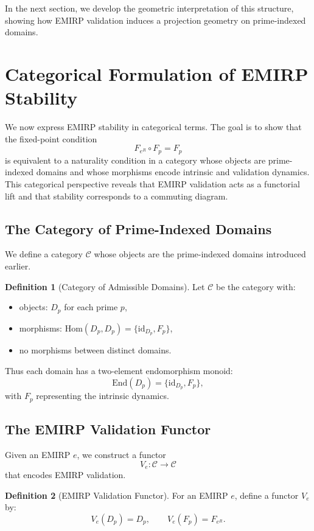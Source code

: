\documentclass[11pt]{article}
\theoremstyle{definition}
\newtheorem{definition}{Definition}[section]
\theoremstyle{plain}
\theoremstyle{remark}
\begin{document}
In the next section, we develop the geometric interpretation of this
structure, showing how EMIRP validation induces a projection geometry on
prime-indexed domains.

\section{Categorical Formulation of EMIRP Stability}

We now express EMIRP stability in categorical terms. The goal is to show
that the fixed-point condition
\[
F_{e^R} \circ F_p = F_p
\]
is equivalent to a naturality condition in a category whose objects are
prime-indexed domains and whose morphisms encode intrinsic and
validation dynamics. This categorical perspective reveals that EMIRP
validation acts as a functorial lift and that stability corresponds to a
commuting diagram.

\subsection{The Category of Prime-Indexed Domains}

We define a category $\mathcal{C}$ whose objects are the prime-indexed
domains introduced earlier.

\begin{definition}[Category of Admissible Domains]
Let $\mathcal{C}$ be the category with:
\begin{itemize}
    \item objects: $D_p$ for each prime $p$,
    \item morphisms: $\mathrm{Hom}(D_p, D_p) = \{ \mathrm{id}_{D_p}, F_p \}$,
    \item no morphisms between distinct domains.
\end{itemize}
\end{definition}

Thus each domain has a two-element endomorphism monoid:
\[
\mathrm{End}(D_p) = \{ \mathrm{id}_{D_p}, F_p \},
\]
with $F_p$ representing the intrinsic dynamics.

\subsection{The EMIRP Validation Functor}

Given an EMIRP $e$, we construct a functor
\[
V_e : \mathcal{C} \to \mathcal{C}
\]
that encodes EMIRP validation.

\begin{definition}[EMIRP Validation Functor]
For an EMIRP $e$, define a functor $V_e$ by:
\[
V_e(D_p) = D_p, \qquad
V_e(F_p) = F_{e^R}.
\]
\end{definition}
\end{document}
